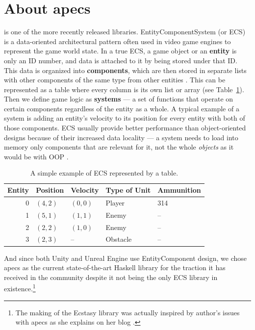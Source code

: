 \documentclass[
  digital, %
  color,   %
  table,   %
  oneside, %
  lof,     %
  lot,     %
]{fithesis3}
\begin{document}
\section{About apecs}
\label{sect:apecs}
 \cite{apecsrepo}
is one of the more recently released libraries.
Entity\textendash{}Component\textendash{}System (or ECS) is a data-oriented architectural pattern often
used in video game engines to represent the game world state.
In a true ECS, a game object or an \textbf{entity} is only an ID number,
and data is attached to it by being stored under that ID. This data is
organized into \textbf{components}, which are then stored in separate
lists with other components of the same type from other entities \cite{mediumecs}. This can
be represented as a table where every column is its own list or array
(see Table~\ref{tab:ecsexamp}). Then we define game logic as \textbf{systems}
--- a set of functions that operate on certain components regardless of the
entity as a whole. A typical example of a system is adding an entity's velocity
to its position for every entity with both of those components.
ECS usually provide better performance than object-oriented designs
because of their increased data locality --- a system needs to load into memory
only components that are relevant for it, not the whole \emph{objects}
as it would be with OOP \cite{apecspaper}.
\begin{table}[htp]
  \begin{tabularx}{320pt}{|r|lllX|}
    \toprule
    Entity & Position & Velocity & Type of Unit & Ammunition \\
    \midrule
    0 & $(4,2)$ & $(0,0)$ & Player   & 314\\
    1 & $(5,1)$ & $(1,1)$ & Enemy    & -- \\
    2 & $(2,2)$ & $(1,0)$ & Enemy    & -- \\
    3 & $(2,3)$ & --      & Obstacle & -- \\
    \bottomrule
  \end{tabularx}
  \caption{A simple example of ECS represented by a table.}
  \label{tab:ecsexamp}
\end{table}

And since both Unity and Unreal Engine use Entity\textendash{}Component design,
we chose apecs as the current state-of-the-art Haskell library
for the traction it has received in the community despite
it not being the only ECS library in existence.\footnote{
The making of the Ecstasy library was actually inspired by
author's issues with apecs as she explains on her blog \cite{whyecstasy}.
}
\end{document}
